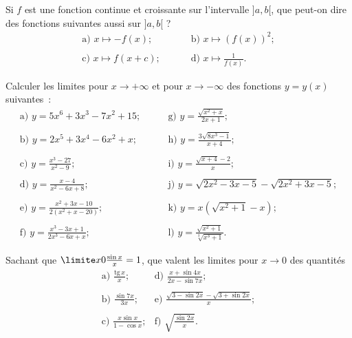 \documentclass[12pt,french,oneside,a4paper]{memoir} %
\begin{document}
\begin{exo}
Si $f$ est une fonction continue et croissante sur l'intervalle $]a,b[$, que peut-on dire des fonctions suivantes aussi sur  $]a,b[$ ?
 \begin{equation*}
 \begin{array}{ll}
 \mbox{a) } x \mapsto -f(x); \qquad &\mbox{ b) } x \mapsto (f(x))^2; \\
 & \\
 \mbox{c) } x \mapsto f(x+c); \qquad &\mbox{ d) } x \mapsto \displaystyle{
 \frac{1}{f(x)}}.
 \end{array}
\end{equation*}
\end{exo}

\begin{exo}
Calculer les limites pour $x \rightarrow + \infty$ et pour 
 $x \rightarrow - \infty$ des fonctions $y=y(x)$ suivantes~:
 \begin{equation*}
 \begin{array}{ll}
 \mbox{a) } y=5x^6+3x^3-7x^2+15; \qquad
 &\mbox{g) } y=\displaystyle{\frac{\sqrt{x^2+x}}{2x+1}}; \\
 & \\
 \mbox{b) } y=2x^5+3x^4-6x^2+x;
 &\mbox{h) } y=\displaystyle{\frac{3 \sqrt{8x^3-1}}{x+4}}; \\
 & \\
 \mbox{c) } y=\displaystyle{\frac{x^3-27}{x^2-9}}; 
 &\mbox{i) } y=\displaystyle{\frac{\sqrt{x+4}-2}{x}}; \\
 & \\
 \mbox{d) } y=\displaystyle{\frac{x-4}{x^2-6x+8}};
 &\mbox{j) } y=\sqrt{2x^2-3x-5}- \sqrt{2x^2+3x-5}; \\
 & \\
 \mbox{e) } y=\displaystyle{\frac{x^2+3x-10}{2(x^2+x-20)}};
 &\mbox{k) } y=x(\sqrt{x^2+1}-x); \\
 & \\
 \mbox{f) } y=\displaystyle{\frac{x^3-3x+1}{2x^3-6x+x}};
 &\mbox{l) } y=\displaystyle{\frac{\sqrt{x^2+1}}{\sqrt[3]{x^3+1}}}.
 \end{array}
\end{equation*}
\end{exo}

\begin{exo}
Sachant que $\limite x 0 \frac{\sin x}{x}=1$, que valent les limites pour $x \rightarrow 0$ des quantités
 \begin{equation*}
 \begin{array}{ll}
 \mbox{a) } \frac{\mbox{tg}\, x}{x}; 
 &\mbox{d) } \frac{x+\sin 4x}{2x- \sin 7x}; \\
 &\\
 \mbox{b) } \frac{\sin 7x}{3x}; 
 &\mbox{e) } \frac{\sqrt{3- \sin 2x}- \sqrt{3+ \sin 2x}}{x}; \\
 & \\
 \mbox{c) } \frac{x \sin x}{1- \cos x}; 
 &\mbox{f) } \sqrt{\frac{\sin 2x}{x}}.
 \end{array}
\end{equation*}
\end{exo}
\end{document}
